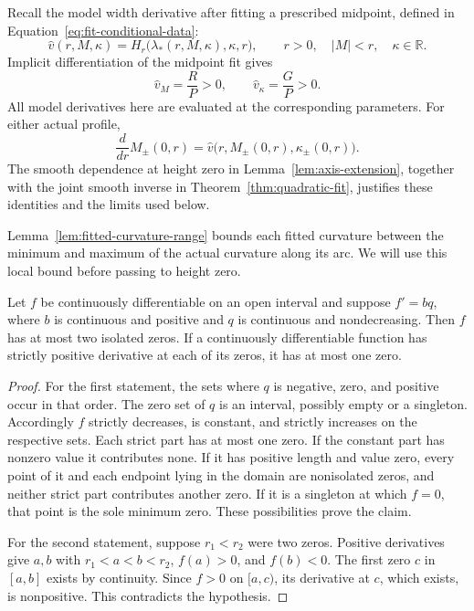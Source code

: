Recall the model width derivative after fitting a prescribed midpoint,
defined in Equation~\eqref{eq:fit-conditional-data}:
\[
 \widehat v(r,M,\kappa)
 =H_r\bigl(\lambda_*(r,M,\kappa),\kappa,r\bigr),
 \qquad r>0,\quad |M|<r,\quad \kappa\in\mathbb R.
\]
Implicit differentiation of the midpoint fit gives
\begin{equation}\label{eq:V-derivatives}
 \widehat v_M=\frac RP>0,\qquad
 \widehat v_\kappa=\frac GP>0.
\end{equation}
All model derivatives here are evaluated at the corresponding
parameters. For either actual profile,
\begin{equation}\label{eq:midpoint-ode}
 \frac{d}{dr}M_\pm(0,r)
 =\widehat v\bigl(r,M_\pm(0,r),\kappa_\pm(0,r)\bigr).
\end{equation}
The smooth dependence at height zero in
Lemma~\ref{lem:axis-extension}, together with the joint smooth
inverse in Theorem~\ref{thm:quadratic-fit}, justifies these identities
and the limits used below.

Lemma~\ref{lem:fitted-curvature-range} bounds each fitted curvature
between the minimum and maximum of the actual curvature along its
arc. We will use this local bound before passing to height zero.

\begin{lemma}\label{lem:isolated-zero-count}
Let $f$ be continuously differentiable on an open interval and
suppose $f'=bq$, where $b$ is continuous and positive and $q$ is
continuous and nondecreasing. Then $f$ has at most two isolated
zeros. If a continuously differentiable function has strictly
positive derivative at each of its zeros, it has at most one zero.
\end{lemma}

\begin{proof}
For the first statement, the sets where $q$ is negative, zero,
and positive occur in that order. The zero set of $q$ is an
interval, possibly empty or a singleton. Accordingly $f$ strictly
decreases, is constant, and strictly increases on the respective
sets. Each strict part has at most one zero. If the constant part
has nonzero value it contributes none. If it has positive length
and value zero, every point of it and each endpoint lying in the
domain are nonisolated zeros, and neither strict part contributes
another zero. If it is a singleton at which $f=0$, that point is
the sole minimum zero. These possibilities prove the claim.

For the second statement, suppose $r_1<r_2$ were two zeros.
Positive derivatives give $a,b$ with
$r_1<a<b<r_2$, $f(a)>0$, and $f(b)<0$. The first zero $c$ in
$[a,b]$ exists by continuity. Since $f>0$ on $[a,c)$, its
derivative at $c$, which exists, is nonpositive. This contradicts
the hypothesis.
\end{proof}

